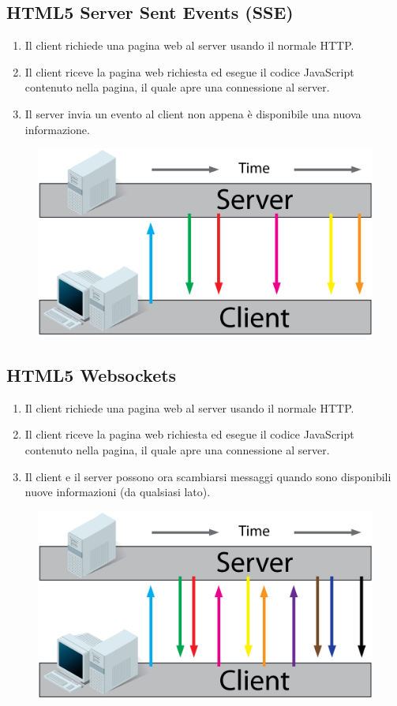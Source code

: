 \subsection{HTML5 Server Sent Events (SSE)}
\begin{enumerate}
	\item Il client richiede una pagina web al server usando il normale HTTP.
	\item Il client riceve la pagina web richiesta ed esegue il codice JavaScript contenuto nella pagina, il quale apre una connessione al server.
	\item Il server invia un evento al client non appena è disponibile una nuova informazione.
\end{enumerate}
\begin{figure}[h]
	\centering
	\includegraphics[scale=0.4]{Immagini/server_sent_events.png}
\end{figure}
\newpage
\subsection{HTML5 Websockets}
\begin{enumerate}
	\item Il client richiede una pagina web al server usando il normale HTTP.
	\item Il client riceve la pagina web richiesta ed esegue il codice JavaScript contenuto nella pagina, il quale apre una connessione al server.
	\item Il client e il server possono ora scambiarsi messaggi quando sono disponibili nuove informazioni (da qualsiasi lato).
\end{enumerate}
\begin{figure}[h]
	\centering
	\includegraphics[scale=0.4]{Immagini/websockets.png}
\end{figure}